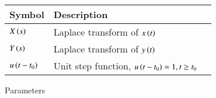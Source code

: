\setlength{\arrayrulewidth}{0.3mm}
\setlength{\tabcolsep}{15pt}
\renewcommand{\arraystretch}{1.5}



\begin{tabular}{ |p{1cm}|p{3cm}|p{1cm}| }
\hline
Symbol & Description\\
\hline
$X\left(s\right)$ & Laplace transform of $x\left(t\right)$\\
\hline
$Y\left(s\right)$ & Laplace transform of $y\left(t\right)$ \\
\hline
$u\left(t-t_0\right)$ & Unit step function, $u\left(t-t_0\right) = 1, t \geq t_0$\\
\hline
\end{tabular}
\caption{Parameters}
